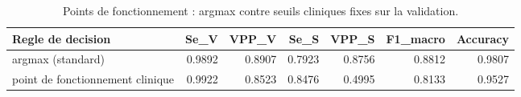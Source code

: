 \begin{table}
\caption{Points de fonctionnement : argmax contre seuils cliniques fixes sur la validation.}
\label{tab:operating}
\begin{tabular}{lrrrrrr}
\toprule
Regle de decision & Se_V & VPP_V & Se_S & VPP_S & F1_macro & Accuracy \\
\midrule
argmax (standard) & 0.9892 & 0.8907 & 0.7923 & 0.8756 & 0.8812 & 0.9807 \\
point de fonctionnement clinique & 0.9922 & 0.8523 & 0.8476 & 0.4995 & 0.8133 & 0.9527 \\
\bottomrule
\end{tabular}
\end{table}
